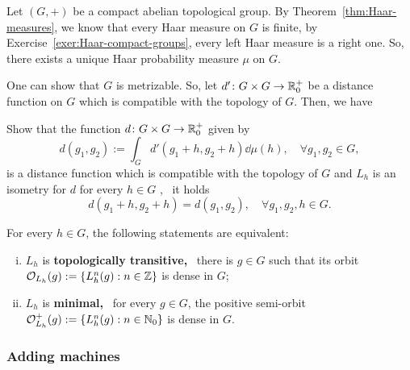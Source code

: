 Let $(G,+)$ be a compact abelian topological group. By Theorem~\ref{thm:Haar-measures}, we know that every Haar measure on $G$ is finite, by Exercise~\ref{exer:Haar-compact-groups}, every left Haar measure is a right one. So, there exists a unique Haar probability measure $\mu$ on $G$.

One can show that $G$ is metrizable. So, let $d'\colon G\times G\to \mathbb{R}_{0}^+$ be a distance function on $G$ which is compatible with the topology of $G$.  Then, we have

\begin{exercise}\label{exer:abelian-groups-existence-invariant-distance}
  Show that the function $d\colon G\times G\to\mathbb{R}_0^+$ given by
  \begin{displaymath}
    d(g_1,g_2):=\int_G d'(g_1+h,g_2+h)\dd\mu(h), \quad\forall g_1,g_2\in G,
  \end{displaymath}
  is a distance function which is compatible with the topology of $G$ and $L_h$ is an isometry for $d$ for every $h\in G$ , \ie~it holds
  \begin{displaymath}
    d(g_1+h,g_2+h)=d(g_1,g_2), \quad\forall g_1,g_2,h\in G.
  \end{displaymath}
\end{exercise}

\begin{exercise}\label{exer:abelian-groups-dynamics-translations}
  For every $h\in G$, the following statements are equivalent:
  \begin{enumerate}[(i)]
    \item $L_h$ is \textbf{topologically transitive,} \ie~there is $g\in G$ such that its orbit $\mathcal{O}_{L_h}(g):=\{L_h^n(g) : n\in\mathbb{Z}\}$ is dense in $G$;
    \item $L_h$ is \textbf{minimal,} \ie~for every $g\in G$, the positive semi-orbit $\mathcal{O}_{L_h}^+(g):=\{L_h^n(g) : n\in\mathbb{N}_0\}$ is dense in $G$.
  \end{enumerate}
\end{exercise}


\subsubsection{Adding machines}
\label{sec:adding-machines}

